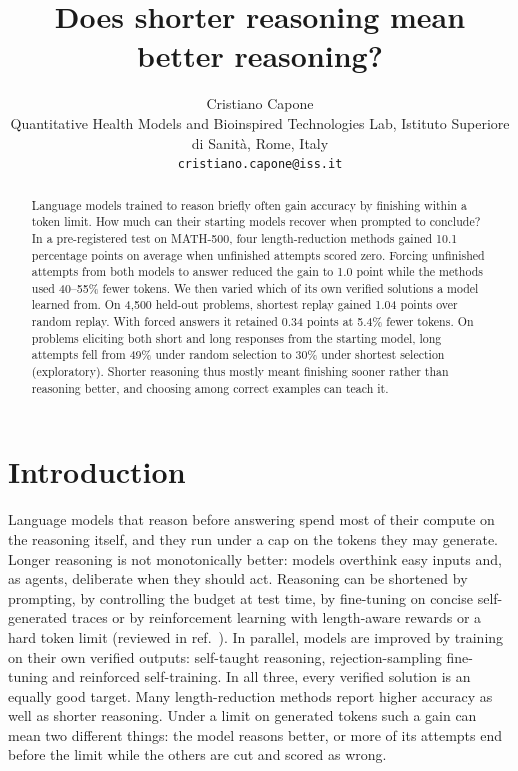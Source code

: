 \documentclass[10pt]{article}
\title{\sffamily\bfseries\Large Does shorter reasoning mean better reasoning?}
\author{\normalfont Cristiano Capone\\[2pt]\normalsize Quantitative Health Models and Bioinspired Technologies Lab, Istituto Superiore di Sanit\`a, Rome, Italy\\[1pt]\small\texttt{cristiano.capone@iss.it}}
\date{}
\begin{document}
\maketitle
\suppressfloats[t]

\begin{abstract}
\noindent Language models trained to reason briefly often gain accuracy by finishing within a token limit. How much can their starting models recover when prompted to conclude? In a pre-registered test on MATH-500, four length-reduction methods gained 10.1 percentage points on average when unfinished attempts scored zero. Forcing unfinished attempts from both models to answer reduced the gain to 1.0 point while the methods used 40--55\% fewer tokens. We then varied which of its own verified solutions a model learned from. On 4,500 held-out problems, shortest replay gained 1.04 points over random replay. With forced answers it retained 0.34 points at 5.4\% fewer tokens. On problems eliciting both short and long responses from the starting model, long attempts fell from 49\% under random selection to 30\% under shortest selection (exploratory). Shorter reasoning thus mostly meant finishing sooner rather than reasoning better, and choosing among correct examples can teach it.
\end{abstract}

\section{Introduction}
Language models that reason before answering spend most of their compute on the reasoning itself, and they run under a cap on the tokens they may generate. Longer reasoning is not monotonically better: models overthink easy inputs\cite{chen2024overthinking} and, as agents, deliberate when they should act\cite{cuadron2025overthinking}. Reasoning can be shortened by prompting\cite{xu2025chainofdraft}, by controlling the budget at test time\cite{muennighoff2025s1,ma2025nothinking,xu2026elastic,qi2025anytime}, by fine-tuning on concise self-generated traces\cite{munkhbat2025concise} or by reinforcement learning with length-aware rewards or a hard token limit\cite{yi2025shorterbetter,hou2025thinkprune,aggarwal2025l1,shrivastava2026gfpo,liu2025dler} (reviewed in ref.~). In parallel, models are improved by training on their own verified outputs: self-taught reasoning\cite{zelikman2022star}, rejection-sampling fine-tuning\cite{yuan2023rft} and reinforced self-training\cite{gulcehre2023rest}. In all three, every verified solution is an equally good target. Many length-reduction methods report higher accuracy as well as shorter reasoning. Under a limit on generated tokens such a gain can mean two different things: the model reasons better, or more of its attempts end before the limit while the others are cut and scored as wrong.
\end{document}
